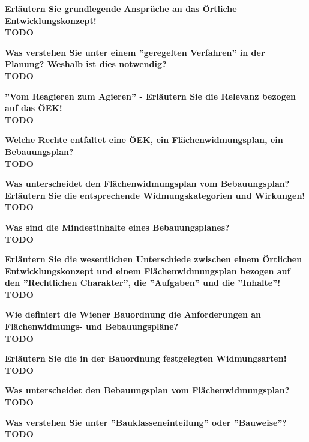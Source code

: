 \documentclass[]{article}
\newenvironment{question}{\vspace{8mm}\noindent\bfseries}{\\}
\begin{document}
\begin{question}
	Erläutern Sie grundlegende Ansprüche an das Örtliche Entwicklungskonzept!
\end{question}
TODO

\begin{question}
	Was verstehen Sie unter einem ''geregelten Verfahren'' in der Planung? Weshalb ist dies notwendig?
\end{question}
TODO


\begin{question}
	''Vom Reagieren zum Agieren'' - Erläutern Sie die Relevanz bezogen auf das ÖEK!
\end{question}
TODO

\begin{question}
	Welche Rechte entfaltet eine ÖEK, ein Flächenwidmungsplan, ein Bebauungsplan?
\end{question}
TODO

\begin{question}
	Was unterscheidet den Flächenwidmungsplan vom Bebauungsplan? Erläutern Sie die entsprechende Widmungskategorien und Wirkungen!
\end{question}
TODO

\begin{question}
	Was sind die Mindestinhalte eines Bebauungsplanes?
\end{question}
TODO

\begin{question}
	Erläutern Sie die wesentlichen Unterschiede zwischen einem Örtlichen Entwicklungskonzept und einem Flächenwidmungsplan bezogen auf den ''Rechtlichen Charakter'', die ''Aufgaben'' und die ''Inhalte''!
\end{question}
TODO

\begin{question}
	Wie definiert die Wiener Bauordnung die Anforderungen an Flächenwidmungs- und Bebauungspläne?
\end{question}
TODO

\begin{question}
	Erläutern Sie die in der Bauordnung festgelegten Widmungsarten!
\end{question}
TODO

\begin{question}
	Was unterscheidet den Bebauungsplan vom Flächenwidmungsplan?
\end{question}
TODO

\begin{question}
	Was verstehen Sie unter ''Bauklasseneinteilung'' oder ''Bauweise''?
\end{question}
TODO
\end{document}
